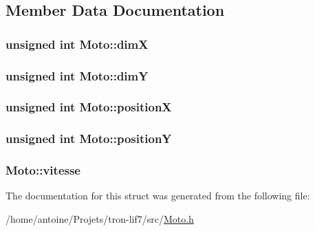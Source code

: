 \subsection{Member Data Documentation}
\hypertarget{structMoto_aeff28579dc6195025dec40699a1ab8bf}{
\subsubsection[{dim\-X}]{\setlength{\rightskip}{0pt plus 5cm}unsigned int Moto\-::dim\-X}}\label{structMoto_aeff28579dc6195025dec40699a1ab8bf}
\hypertarget{structMoto_a4078dd1449ea7b14d9edf4f2faf71c62}{
\subsubsection[{dim\-Y}]{\setlength{\rightskip}{0pt plus 5cm}unsigned int Moto\-::dim\-Y}}\label{structMoto_a4078dd1449ea7b14d9edf4f2faf71c62}
\hypertarget{structMoto_a8fb2706203929b02c7c37fe4fef32ca2}{
\subsubsection[{position\-X}]{\setlength{\rightskip}{0pt plus 5cm}unsigned int Moto\-::position\-X}}\label{structMoto_a8fb2706203929b02c7c37fe4fef32ca2}
\hypertarget{structMoto_ae2f9cc8d1f0cf2fb58b14d827138e11e}{
\subsubsection[{position\-Y}]{\setlength{\rightskip}{0pt plus 5cm}unsigned int Moto\-::position\-Y}}\label{structMoto_ae2f9cc8d1f0cf2fb58b14d827138e11e}
\hypertarget{structMoto_aa5fe56a5edee7ea8f7501e4ed05de8cc}{
\subsubsection[{vitesse}]{ Moto\-::vitesse}}\label{structMoto_aa5fe56a5edee7ea8f7501e4ed05de8cc}


The documentation for this struct was generated from the following file\-:\begin{DoxyCompactItemize}
\item 
/home/antoine/\-Projets/tron-\/lif7/src/\hyperlink{Moto_8h}{Moto.\-h}\end{DoxyCompactItemize}
